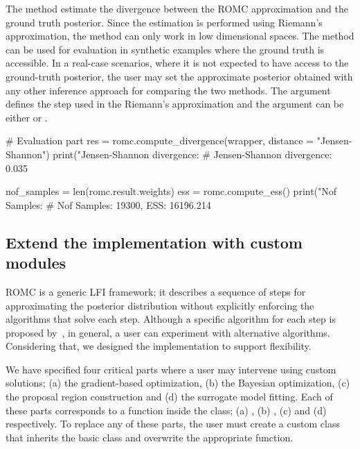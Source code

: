 \documentclass[article]{jss}
\begin{document}
\noindent
The method  estimate the divergence between the ROMC approximation
and the ground truth posterior. Since the estimation is performed
using Riemann's approximation, the method can only work in low
dimensional spaces. The method can be used for evaluation in synthetic
examples where the ground truth is accessible. In a real-case
scenarios, where it is not expected to have access to the ground-truth
posterior, the user may set the approximate posterior obtained with
any other inference approach for comparing the two methods. The
argument  defines the step used in the Riemann's
approximation and the argument  can be either
 or .

\begin{Code}
# Evaluation part
res = romc.compute_divergence(wrapper, distance = "Jensen-Shannon")
print("Jensen-Shannon divergence: %
# Jensen-Shannon divergence: 0.035

nof_samples = len(romc.result.weights)
ess = romc.compute_ess()
print("Nof Samples: %
# Nof Samples: 19300, ESS: 16196.214
\end{Code}


\subsection{Extend the implementation with custom modules}
\label{subsec:extensibility}

ROMC is a generic LFI framework; it describes a sequence of steps for
approximating the posterior distribution without explicitly enforcing
the algorithms that solve each step. Although a specific algorithm for
each step is proposed by~\cite{Ikonomov2019}, in general, a user can
experiment with alternative algorithms. Considering that, we designed
the implementation to support flexibility.

We have specified four critical parts where a user may intervene using
custom solutions; (a) the gradient-based optimization, (b) the
Bayesian optimization, (c) the proposal region construction and (d)
the surrogate model fitting. Each of these parts corresponds to a
function inside the  class; (a)
, (b) , (c)
 and (d) 
respectively. To replace any of these parts, the user must create a
custom class that inherits the basic  class
and overwrite the appropriate function.
\end{document}
